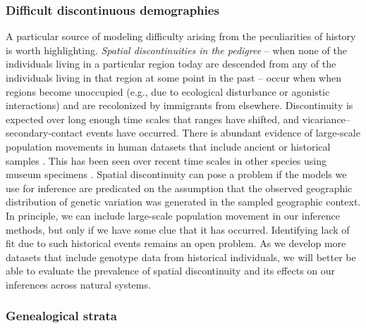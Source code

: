 \documentclass{ar-1col}
\newcommand{\g}[1]{{\color{blue}{#1}}}
\renewcommand{\emph}[1]{{\textit{#1}}}
\begin{document}
\subsubsection{Difficult discontinuous demographies}

\g{what to do here re: brad's comment?  Go back to original?  Bring back ``winter of our discontinuity"?}
A particular source of modeling difficulty arising from the peculiarities of history is worth highlighting.
\emph{Spatial discontinuities in the pedigree} --
when none of the individuals living in a particular region today
are descended from any of the individuals living in that region 
at some point in the past --
occur when when regions become unoccupied
(e.g., due to ecological disturbance or agonistic interactions) 
and are recolonized by immigrants from elsewhere. 
Discontinuity is expected over long enough time scales that ranges have shifted,
and vicariance--secondary-contact events have occurred.
There is abundant evidence of large-scale population movements
in human datasets that include ancient or historical samples 
\citep{skoglund2014investigating, PickrellReich2014, lazaridis_ancient_2014, haak2015massive, joseph2018inference}.
This has been seen over recent time scales in other species using museum specimens \citep{bi2013unlocking}.
Spatial discontinuity can pose a problem 
if the models we use for inference are predicated on the assumption that 
the observed geographic distribution of genetic variation 
was generated in the sampled geographic context.
In principle, we can include large-scale population movement in our inference methods,
but only if we have some clue that it has occurred.
Identifying lack of fit due to such historical events
remains an open problem.
As we develop more datasets that include genotype data from historical individuals, 
we will better be able to evaluate the prevalence of spatial discontinuity 
and its effects on our inferences across natural systems. 

\subsubsection{Genealogical strata}
\end{document}
